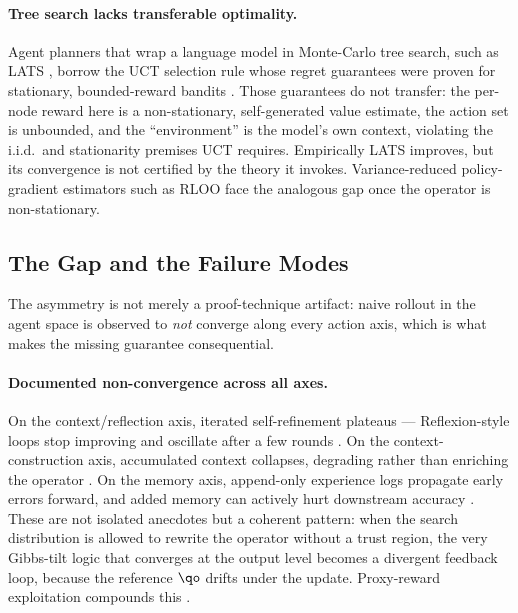 \paragraph{Tree search lacks transferable optimality.} Agent planners that wrap a language model in Monte-Carlo tree search, such as LATS \citep{lats2023}, borrow the UCT selection rule whose regret guarantees were proven for stationary, bounded-reward bandits \citep{kocsis2006uct}. Those guarantees do not transfer: the per-node reward here is a non-stationary, self-generated value estimate, the action set is unbounded, and the ``environment'' is the model's own context, violating the i.i.d.\ and stationarity premises UCT requires. Empirically LATS improves, but its convergence is not certified by the theory it invokes. Variance-reduced policy-gradient estimators such as RLOO \citep{ahmadian2024rloo,greensmith2004variance} face the analogous gap once the operator is non-stationary.

\subsection{The Gap and the Failure Modes}
\label{subsec:gap}

The asymmetry is not merely a proof-technique artifact: naive rollout in the agent space is observed to \emph{not} converge along every action axis, which is what makes the missing guarantee consequential.

\paragraph{Documented non-convergence across all axes.} On the context/reflection axis, iterated self-refinement plateaus — Reflexion-style loops stop improving and oscillate after a few rounds \citep{reflexion2023}. On the context-construction axis, accumulated context collapses, degrading rather than enriching the operator \citep{ace2025}. On the memory axis, append-only experience logs propagate early errors forward, and added memory can actively hurt downstream accuracy \citep{expfollowing2025,remembering2026}. These are not isolated anecdotes but a coherent pattern: when the search distribution is allowed to rewrite the operator without a trust region, the very Gibbs-tilt logic that converges at the output level becomes a divergent feedback loop, because the reference $\qo$ drifts under the update. Proxy-reward exploitation compounds this \citep{skalse2022rewardhacking,gao2023overopt}.


